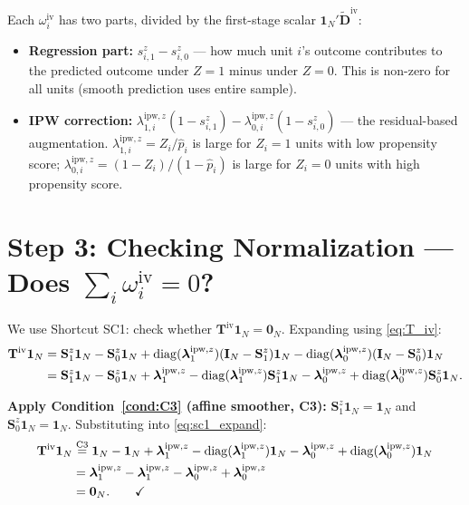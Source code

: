 \documentclass[12pt, a4paper]{article}
\theoremstyle{condstyle}
\theoremstyle{plain}
\newcommand{\bone}{\mathbf{1}_N}
\newcommand{\bzero}{\mathbf{0}_N}
\newcommand{\IN}{\mathbf{I}_N}
\newcommand{\Sz}[1]{\mathbf{S}^{z}_{#1}}           %
\newcommand{\lipwz}[1]{\boldsymbol{\lambda}^{\mathrm{ipw},z}_{#1}}
\newcommand{\Tiw}{\mathbf{T}^{\mathrm{iv}}}
\newcommand{\phat}{\hat{p}}
\begin{document}
\begin{notebox}
Each $\omega^{\mathrm{iv}}_i$ has two parts, divided by the first-stage scalar
$\bone'\tilde{\mathbf{D}}^{\mathrm{iv}}$:
\begin{itemize}
  \item \textbf{Regression part:} $s^z_{i,1} - s^z_{i,0}$ --- how much unit $i$'s
  outcome contributes to the predicted outcome under $Z=1$ minus under $Z=0$.
  This is non-zero for all units (smooth prediction uses entire sample).
  \item \textbf{IPW correction:} $\lambda^{\mathrm{ipw},z}_{1,i}(1-s^z_{i,1})
  - \lambda^{\mathrm{ipw},z}_{0,i}(1-s^z_{i,0})$ --- the residual-based augmentation.
  $\lambda^{\mathrm{ipw},z}_{1,i} = Z_i/\phat_i$ is large for $Z_i=1$ units with low
  propensity score; $\lambda^{\mathrm{ipw},z}_{0,i} = (1-Z_i)/(1-\phat_i)$ is large
  for $Z_i=0$ units with high propensity score.
\end{itemize}
\end{notebox}

\section{Step 3: Checking Normalization --- Does $\sum_i\omega_i^{\mathrm{iv}}=0$?}
\label{sec:sc1}

We use Shortcut SC1: check whether $\Tiw\bone = \bzero$.
Expanding using \eqref{eq:T_iv}:
\begin{align}
  \Tiw\bone
  &= \Sz{1}\bone - \Sz{0}\bone
    + \mathrm{diag}(\lipwz{1})(\IN-\Sz{1})\bone
    - \mathrm{diag}(\lipwz{0})(\IN-\Sz{0})\bone \notag\\
  &= \Sz{1}\bone - \Sz{0}\bone
    + \lipwz{1} - \mathrm{diag}(\lipwz{1})\Sz{1}\bone
    - \lipwz{0} + \mathrm{diag}(\lipwz{0})\Sz{0}\bone.
  \label{eq:sc1_expand}
\end{align}

\textbf{Apply Condition~\ref{cond:C3} (affine smoother, C3):}
$\Sz{1}\bone = \bone$ and $\Sz{0}\bone = \bone$.
Substituting into \eqref{eq:sc1_expand}:
\begin{align}
  \Tiw\bone
  &\stackrel{\mathrm{C3}}{=}
    \bone - \bone + \lipwz{1} - \mathrm{diag}(\lipwz{1})\bone
    - \lipwz{0} + \mathrm{diag}(\lipwz{0})\bone \notag\\
  &= \lipwz{1} - \lipwz{1} - \lipwz{0} + \lipwz{0} \notag\\
  &= \bzero. \qquad\checkmark
  \label{eq:sc1_result}
\end{align}
\end{document}
